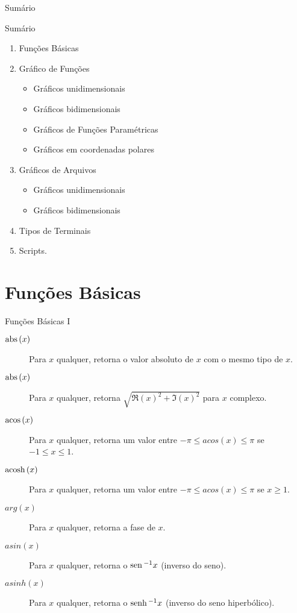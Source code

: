 \begin{slide}[toc=,bm=]{Sumário}
\tableofcontents[content=all] %
\end{slide}

\begin{slide}{Sumário}
  \begin{enumerate}
    \item Funções Básicas\label{s1} \pause
    \item Gráfico de Funções \pause
    \begin{itemize}[type=1]
       \item Gráficos unidimensionais 
       \item Gráficos bidimensionais 
       \item Gráficos de Funções Paramétricas
       \item Gráficos em coordenadas polares \pause
    \end{itemize}
    \item Gráficos de Arquivos \pause[2] %
    \begin{itemize}[type=2]
       \item Gráficos unidimensionais 
       \item Gráficos bidimensionais \pause
    \end{itemize}
    \item Tipos de Terminais \pause
    \item Scripts.
  \end{enumerate}
\end{slide}

\section[tocsection=true]{Funções Básicas}

\begin{slide}[toc=Funções Básicas]{Funções Básicas I}
 
\begin{description}
\item[$\hbox{\rm abs}\,(x)$] Para $x$ qualquer, retorna o valor absoluto de $x$ com o mesmo tipo de $x$.
\item[$\hbox{\rm abs}\,(x)$] Para $x$ qualquer, retorna $\sqrt{\Re(x)^2+\Im(x)^2}$ para $x$ complexo.
\item[$\hbox{\rm acos}\,(x)$] Para $x$ qualquer, retorna um valor entre $-\pi \leq acos(x) \leq \pi$ se $-1\leq x \leq 1$.
\item[$\hbox{\rm acosh}\,(x)$] Para $x$ qualquer, retorna um valor entre $-\pi \leq acos(x) \leq \pi$ se $ x \geq 1$.
\item[$arg(x)$] Para $x$ qualquer, retorna a fase de $x$.
\item[$asin(x)$] Para $x$ qualquer, retorna o $\hbox{\rm sen}\,^{-1} x$ (inverso do seno).
\item[$asinh(x)$] Para $x$ qualquer, retorna o $\hbox{\rm senh}\,^{-1} x$ (inverso do seno hiperbólico).
\end{description}
\end{slide}

